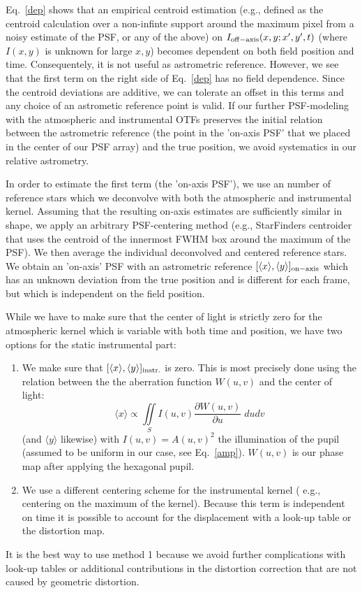 
Eq.~\ref{dep} shows that an empirical centroid estimation (e.g., defined as the centroid calculation over a non-infinte support around the maximum pixel from a noisy estimate of the PSF, or any of the above) on $I_{\rm{off-axis}}(x,y; x',y',t)$ (where $I(x,y)$ is unknown for large $x,y$) becomes dependent on both field position and time. Consequentely, it is not useful as astrometric reference. However, we see that the first term on the right side of Eq.~\ref{dep} has no field dependence. Since the centroid deviations are additive, we can tolerate an offset in this terms and any choice of an astrometic reference point is valid. If our further PSF-modeling with the atmospheric and instrumental OTFs preserves the initial relation between the astrometric reference (the point in the 'on-axis PSF' that we placed in the center of our PSF array) and the true position, we avoid systematics in our relative astrometry.

In order to estimate the first term (the 'on-axis PSF'), we use an number of reference stars which we deconvolve with both the atmospheric and instrumental kernel. Assuming that the resulting on-axis estimates are sufficiently similar in shape, we apply an arbitrary PSF-centering method (e.g., StarFinders centroider that uses the centroid of the innermost FWHM box around the maximum of the PSF). We then average the individual deconvolved and centered reference stars. We obtain an 'on-axis' PSF with an astrometric reference $[\langle x \rangle , \langle y \rangle]_{\rm{on-axis}}$ which has an unknown deviation from the true position and is different for each frame, but which is independent on the field position. 

While we have to make sure that the center of light is strictly zero for the atmospheric kernel which is variable with both time and position, we have two options for the static instrumental part:

\begin{enumerate}

\item
We make sure that $[\langle x \rangle , \langle y \rangle]_{\rm{instr.}}$ is zero. This is most precisely done using the relation between the the aberration function $W(u,v)$ and the center of light:
\begin{equation}
\langle x \rangle \propto \iint \limits_S I(u,v) \frac{\partial W(u,v)}{\partial u} \; du dv
\end{equation}
(and $\langle y \rangle$ likewise) with $I(u,v) = A(u,v)^2$ the illumination of the pupil (assumed to be uniform in our case, see Eq.~\ref{amp}). $W(u,v)$ is our phase map after applying the hexagonal pupil.
\item
We use a different centering scheme for the instrumental kernel ( e.g., centering on the maximum of the kernel). Because this term is independent on time it is possible to account for the displacement with a look-up table or the distortion map. 
\end{enumerate}

It is the best way to use method 1 because we avoid further complications with look-up tables or additional contributions in the distortion correction that are not caused by geometric distortion.


  
  
  